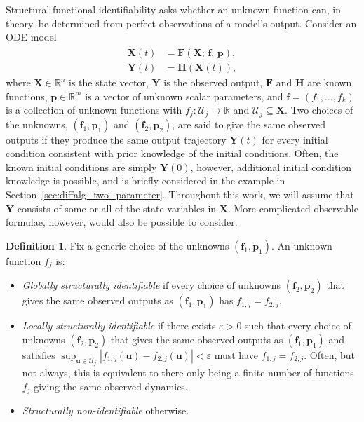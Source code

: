 \documentclass{article}
\theoremstyle{plain}
\theoremstyle{definition}
\newtheorem{definition}{Definition}[section]
\renewcommand{\vec}[1]{\boldsymbol{#1}}
\begin{document}
Structural functional identifiability asks whether an unknown function can, in theory, be determined from perfect observations of a model's output. Consider an ODE model
\begin{align*}
    \dot{\vec{X}}(t)&= \vec{F}(\vec{X};\, \vec{f},\, \vec{p}), \\
    \vec{Y}(t)&=\vec{H}(\vec{X}(t)),
\end{align*}
where $\vec{X}\in\mathbb{R}^n$ is the state vector, $\vec{Y}$ is the observed output, $\vec{F}$ and $\vec{H}$ are known functions, $\vec{p}\in\mathbb{R}^m$ is a vector of unknown scalar parameters, and $\vec{f}=(f_1,\ldots,f_k)$ is a collection of unknown functions with
$f_j:\mathcal{U}_j\to\mathbb{R}$  and $\mathcal{U}_j\subseteq\vec{X}$. Two choices of the unknowns, $(\vec{f}_1,\vec{p}_1)$ and $(\vec{f}_2,\vec{p}_2)$, are said to give the same observed outputs if they produce the same output trajectory $\vec{Y}(t)$ for every initial condition consistent with prior knowledge of the initial conditions. Often, the known initial conditions are simply $\vec{Y}(0)$, however, additional initial condition knowledge is possible, and is briefly considered in the example in Section~\ref{sec:diffalg_two_parameter}. Throughout this work, we will assume that $\vec{Y}$ consists of some or all of the state variables in $\vec{X}$. More complicated observable formulae, however, would also be possible to consider.

\begin{definition} \label{def:functional_identifiability}
Fix a generic choice of the unknowns $(\vec{f}_1,\vec{p}_1)$. An unknown function $f_j$ is:
\begin{itemize}
    \item \emph{Globally structurally identifiable} if every choice
    of unknowns $(\vec{f}_2,\vec{p}_2)$ that gives the same observed outputs as
    $(\vec{f}_1,\vec{p}_1)$ has $f_{1,j}=f_{2,j}$.
    \item \emph{Locally structurally identifiable} if there exists
    $\varepsilon>0$ such that every choice of unknowns $(\vec{f}_2,\vec{p}_2)$ that gives the
    same observed outputs as $(\vec{f}_1,\vec{p}_1)$ and satisfies
    $\sup_{\vec{u}\in\mathcal{U}_j}|f_{1,j}(\vec{u})-f_{2,j}(\vec{u})|<\varepsilon$
    must have $f_{1,j}=f_{2,j}$. Often, but not always, this is equivalent to there only being a finite number of functions $f_j$ giving the same observed dynamics.
    \item \emph{Structurally non-identifiable} otherwise.
\end{itemize}
\end{definition}
\end{document}
